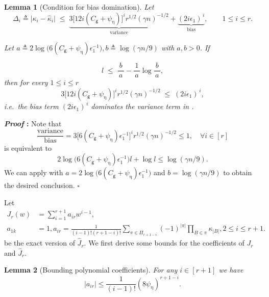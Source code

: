 \documentclass{article}
\def\eps{{\epsilon}}
\def\defeq{\triangleq} %
\newtheorem{lemma}{Lemma}[section]
\renewenvironment{proof}{\noindent\textbf{\textit{Proof }:}}{\hfill$\square$}
\begin{document}
%
\begin{lemma}[Condition for bias domination]
\label{lemma:bias-dominates}
Let 
\[
\Delta_i
\defeq \bigl|\kappa_{i}-\hat{\kappa}_{i}\bigr|
\;\le\;
\underbrace{3\big[12i(C_{\mathsf g}+\psi_{\upeta})\big]^i r^{1/2}(\gamma n)^{-1/2}}_{\text{variance}} +\underbrace{(2i\eps_1)^{\,i}}_{\text{bias}},
\qquad 1\le i\le r.
\label{eq:A1}
\]

Let  $a\defeq  2\log\big(6(C_{\mathsf{g}}+\psi_{\upeta})\eps_1^{-1}\big),
b\defeq \log(\gamma n/9)$ with $a,b>0$.
If  

\begin{equation}\label{eq:bias-cond}
      l\;\le\;
      \frac{b}{\,a\,}-\frac{1}{\,a\,}\log\!\frac{b}{\,a\,},
\end{equation}
then for every $1\le i\le r$
\[
3\big[12i(C_{\mathsf g}+\psi_{\upeta})\big]^i r^{1/2}(\gamma n)^{-1/2} \;\le\;(2i\eps_1)^{\,i},
\]
i.e.~the bias term $(2i\eps_1)^{\,i}$ dominates the variance term in
.
\end{lemma}

\begin{proof}
Note that
\[
\frac{\text{variance}}{\text{bias}} = 3\big[6(C_{\mathsf{g}}+\psi_{\upeta})\eps_1^{-1}\big]^ir^{1/2}(\gamma n)^{-1/2} \leq 1,\quad\forall i\in[r]
\]
is equivalent to
\[
2\log\big(6(C_{\mathsf{g}}+\psi_{\upeta})\eps_1^{-1}\big)l + \log l \leq \log(\gamma n/9).
\]
We can apply  with $a = 2\log\big(6(C_{\mathsf{g}}+\psi_{\upeta})\eps_1^{-1}\big)$ and $b = \log(\gamma n/9)$ to obtain the desired conclusion.
\end{proof}
%

Let 
\begin{equation}
\label{eq:J-l}
    \begin{aligned}
        J_r(w) &= \sum_{i=1}^{r+1} a_{ir} w^{i-1} ,\\  a_{1k} &= 1, a_{ir} = \frac{1}{(i-1)!(r+1-i)!} \sum_{\pi\in\Pi_{r+1-i}} (-1)^{|\pi|} \prod_{B\in\pi}\kappa_{|B|}, 2\leq i\leq r+1.
    \end{aligned}
\end{equation}
be the exact version of $\hat{J}_r$. We first derive some bounds for the coefficients of $J_r$ and $\hat{J}_r$.

\begin{lemma}[Bounding polynomial coefficients]
    \label{lemma:a-ik-bound}
    For any $i\in[r+1]$ we have
    \begin{equation}
    \label{eq:a-ik-bound}
        |a_{ir}| \leq \frac{1}{(i-1)!} (8\psi_{\upeta})^{r+1-i}.
    \end{equation}
\end{lemma}
\end{document}
